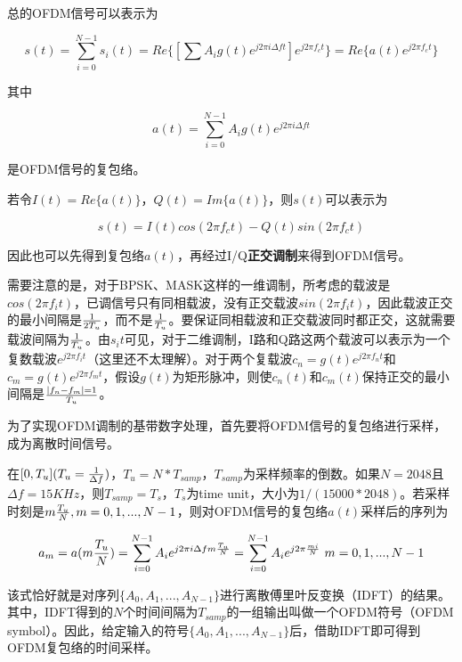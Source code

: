 \documentclass[titlepage]{article}
\numberwithin{figure}{section}
\numberwithin{equation}{section}
\begin{document}
总的OFDM信号可以表示为

\begin{equation}
	s(t)=\sum _{i=0} ^{N-1}s_{i}(t)
	=Re\{[\sum A_{i}g(t)e^{j{2 \pi}i{\Delta f}t}]e^{j{2 \pi}f_{c}t}\}
	=Re\{a(t)e^{j{2 \pi}f_{c}t}\}
\end{equation}

其中

\begin{equation}
	a(t)=\sum _{i=0}^{N-1}A_{i}g(t)e^{j{2\pi}i{\Delta f}t}
\end{equation}

是OFDM信号的复包络。

若令$I(t)=Re\{a(t)\}$，$Q(t)=Im\{a(t)\}$，则$s(t)$可以表示为

\begin{equation}
	s(t)=I(t)cos(2 \pi f_{c}t)-Q(t)sin(2 \pi f_{c}t)
\end{equation}

因此也可以先得到复包络$a(t)$，再经过I/Q\textbf{正交调制}来得到OFDM信号。

需要注意的是，对于BPSK、MASK这样的一维调制，所考虑的载波是$cos(2\pi f_{i}t)$，已调信号只有同相载波，没有正交载波$sin(2 \pi f_{i}t)$，因此载波正交的最小间隔是$1\over {2T_{u}}$，而不是$1\over {T_{u}}$。要保证同相载波和正交载波同时都正交，这就需要载波间隔为$1\over T_{u}$。由$s_{i}t$可见，对于二维调制，I路和Q路这两个载波可以表示为一个复数载波$e^{j2\pi f_{i}t}$（这里还不太理解）。对于两个复载波$c_{n}=g(t)e^{j2\pi f_{n}t}$和$c_{m}=g(t)e^{j2\pi f_{m}t}$，假设$g(t)$为矩形脉冲，则使$c_{n}(t)$和$c_{m}(t)$保持正交的最小间隔是$|f_{n}-f_{m}|=1\over T_{u}$。

为了实现OFDM调制的基带数字处理，首先要将OFDM信号的复包络进行采样，成为离散时间信号。

在$[0,T_{u}] (T_{u}={1\over {\Delta f}})$，$T_{u}=N*T_{samp}$，$T_{samp}$为采样频率的倒数。如果$N=2048$且$\Delta f = 15KHz$，则$T_{samp}=T_{s}$，$T_{s}$为time unit\cite{erik}，大小为$1/(15000*2048)$。若采样时刻是$m{T_{u} \over N}, m=0,1,...,N-1$，则对OFDM信号的复包络$a(t)$采样后的序列为

\begin{equation}
	a_{m}=a(m{T_{u}\over N})=\sum _{i=0} ^{N-1} A_{i}e^{j2\pi i \Delta f m{T_{u} \over N}}
	=\sum _{i=0} ^{N-1}A_{i}e^{j2\pi {mi \over N}} \ m = 0,1,...,N-1
\end{equation}

该式恰好就是对序列$\{A_{0},A_{1},...,A_{N-1}\}$进行离散傅里叶反变换（IDFT）的结果。其中，IDFT得到的$N$个时间间隔为$T_{samp}$的一组输出叫做一个OFDM符号（OFDM symbol）。因此，给定输入的符号$\{A_{0},A_{1},...,A_{N-1}\}$后，借助IDFT即可得到OFDM复包络的时间采样。
\end{document}
